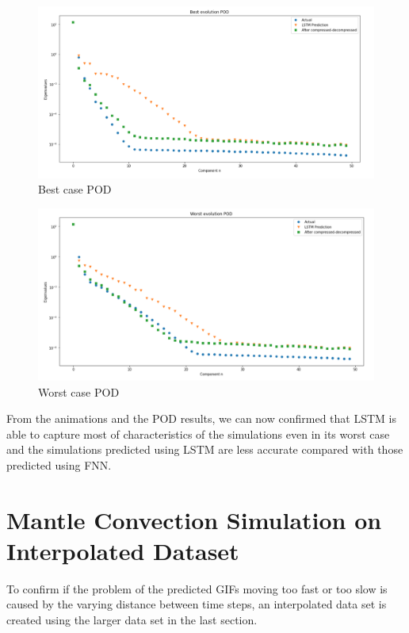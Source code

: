 \begin{figure}[H]
    \caption{Best case POD}
    \includegraphics[scale=0.5]{figures/mantle_convection_images/larger_dataset/LSTM_Best_POD.png}
\end{figure}

\begin{figure}[H]
    \caption{Worst case POD}
    \includegraphics[scale=0.5]{figures/mantle_convection_images/larger_dataset/LSTM_Worst_POD.png}
\end{figure}

From the animations and the POD results, we can now confirmed that LSTM is able to capture most of characteristics of the simulations even in its worst case and the simulations predicted using LSTM are less accurate compared with those predicted using FNN.


\section{Mantle Convection Simulation on Interpolated Dataset}

To confirm if the problem of the predicted GIFs moving too fast or too slow is caused by the varying distance between time steps, an interpolated data set is created using the larger data set in the last section.

